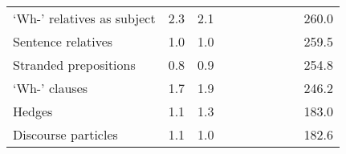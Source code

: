 \begin{table}[!t]
\begin{tabular*}{\linewidth}{@{\extracolsep{\fill}}lrrrrrrrrr}
‘Wh-’ relatives as subject & 2.3 & 2.1 & {\cellcolor[HTML]{F4A582}{\textcolor[HTML]{000000}{70\%}}} & {\cellcolor[HTML]{F4A582}{\textcolor[HTML]{000000}{66\%}}} & {\cellcolor[HTML]{F7F7F7}{\textcolor[HTML]{000000}{109\%}}} & {\cellcolor[HTML]{F7F7F7}{\textcolor[HTML]{000000}{102\%}}} & {\cellcolor[HTML]{F7F7F7}{\textcolor[HTML]{000000}{106\%}}} & {\cellcolor[HTML]{F7F7F7}{\textcolor[HTML]{000000}{103\%}}} & 260.0 \\ 
Sentence relatives & 1.0 & 1.0 & {\cellcolor[HTML]{F4A582}{\textcolor[HTML]{000000}{50\%}}} & {\cellcolor[HTML]{F4A582}{\textcolor[HTML]{000000}{51\%}}} & {\cellcolor[HTML]{F7F7F7}{\textcolor[HTML]{000000}{104\%}}} & {\cellcolor[HTML]{D1E5F0}{\textcolor[HTML]{000000}{117\%}}} & {\cellcolor[HTML]{F7F7F7}{\textcolor[HTML]{000000}{101\%}}} & {\cellcolor[HTML]{F7F7F7}{\textcolor[HTML]{000000}{92\%}}} & 259.5 \\ 
Stranded prepositions & 0.8 & 0.9 & {\cellcolor[HTML]{F4A582}{\textcolor[HTML]{000000}{66\%}}} & {\cellcolor[HTML]{F4A582}{\textcolor[HTML]{000000}{66\%}}} & {\cellcolor[HTML]{D1E5F0}{\textcolor[HTML]{000000}{111\%}}} & {\cellcolor[HTML]{D1E5F0}{\textcolor[HTML]{000000}{114\%}}} & {\cellcolor[HTML]{FDDBC7}{\textcolor[HTML]{000000}{87\%}}} & {\cellcolor[HTML]{FDDBC7}{\textcolor[HTML]{000000}{81\%}}} & 254.8 \\ 
‘Wh-’ clauses & 1.7 & 1.9 & {\cellcolor[HTML]{FDDBC7}{\textcolor[HTML]{000000}{75\%}}} & {\cellcolor[HTML]{F4A582}{\textcolor[HTML]{000000}{66\%}}} & {\cellcolor[HTML]{FDDBC7}{\textcolor[HTML]{000000}{90\%}}} & {\cellcolor[HTML]{FDDBC7}{\textcolor[HTML]{000000}{78\%}}} & {\cellcolor[HTML]{D1E5F0}{\textcolor[HTML]{000000}{126\%}}} & {\cellcolor[HTML]{D1E5F0}{\textcolor[HTML]{000000}{122\%}}} & 246.2 \\ 
Hedges & 1.1 & 1.3 & {\cellcolor[HTML]{D6604D}{\textcolor[HTML]{FFFFFF}{50\%}}} & {\cellcolor[HTML]{F4A582}{\textcolor[HTML]{000000}{63\%}}} & {\cellcolor[HTML]{F4A582}{\textcolor[HTML]{000000}{62\%}}} & {\cellcolor[HTML]{F4A582}{\textcolor[HTML]{000000}{67\%}}} & {\cellcolor[HTML]{FDDBC7}{\textcolor[HTML]{000000}{89\%}}} & {\cellcolor[HTML]{F7F7F7}{\textcolor[HTML]{000000}{92\%}}} & 183.0 \\ 
Discourse particles & 1.1 & 1.0 & {\cellcolor[HTML]{F4A582}{\textcolor[HTML]{000000}{60\%}}} & {\cellcolor[HTML]{F4A582}{\textcolor[HTML]{000000}{60\%}}} & {\cellcolor[HTML]{FDDBC7}{\textcolor[HTML]{000000}{89\%}}} & {\cellcolor[HTML]{F7F7F7}{\textcolor[HTML]{000000}{91\%}}} & {\cellcolor[HTML]{92C5DE}{\textcolor[HTML]{000000}{146\%}}} & {\cellcolor[HTML]{92C5DE}{\textcolor[HTML]{000000}{140\%}}} & 182.6 \\ 

\end{tabular*}
\end{table}
